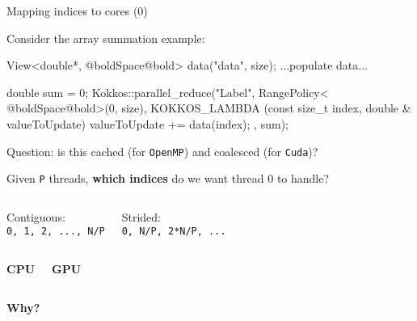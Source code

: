 \ifmedium
\begin{frame}[fragile]{Mapping indices to cores (0)}

  Consider the array summation example:

  \begin{code}[keywords={}]
View<double*, @boldSpace@bold> data("data", size);
...populate data...

double sum = 0;
Kokkos::parallel_reduce("Label", 
  RangePolicy< @boldSpace@bold>(0, size),
  KOKKOS_LAMBDA (const size_t index, double & valueToUpdate) {
    valueToUpdate += data(index);
  },
  sum);
  \end{code}

  \vspace{0pt}

  Question: is this cached (for \texttt{OpenMP}) and coalesced (for \texttt{Cuda})?

  \pause
  \vspace{5pt}

  Given \texttt{P} threads, \textbf{which indices} do we want thread 0 to handle?

  \vspace{-15pt}

  \begin{columns}[t,onlytextwidth]
      \begin{center}
        Contiguous: \\
        \texttt{0, 1, 2, ..., N/P}
      \end{center}
      \begin{center}
        Strided: \\
        \texttt{0, N/P, 2*N/P, ...}
      \end{center}
  \end{columns}

  \vspace{-10pt}
  \pause

  \begin{columns}[t,onlytextwidth]
      \begin{center}
        \textbf{CPU}
      \end{center}
      \begin{center}
        \textbf{GPU}
      \end{center}
  \end{columns}

  \vspace{-10pt}

  \begin{center}
    \textbf{Why?}
  \end{center}

  \vspace{-10pt}

\end{frame}
\fi

